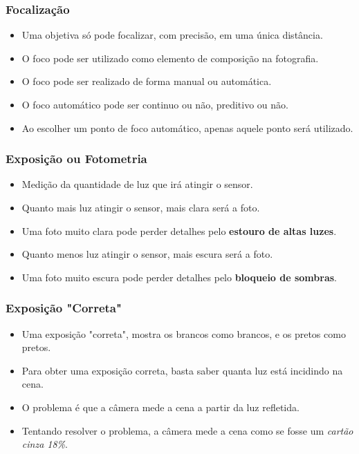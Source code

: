 \begin{frame}
    \frametitle{Focalização}
    \begin{itemize}
        \item Uma objetiva só pode focalizar, com precisão, em uma única distância.
        \item O foco pode ser utilizado como elemento de composição na fotografia.
        \item O foco pode ser realizado de forma manual ou automática.
        \item O foco automático pode ser continuo ou não, preditivo ou não.
        \item Ao escolher um ponto de foco automático, apenas aquele ponto será utilizado.
    \end{itemize}
\end{frame}

\begin{frame}
    \frametitle{Exposição ou Fotometria}
    \begin{itemize}
        \item Medição da quantidade de luz que irá atingir o sensor.
        \item Quanto mais luz atingir o sensor, mais clara será a foto.
        \item Uma foto muito clara pode perder detalhes pelo \textbf{estouro de altas luzes}.
        \item Quanto menos luz atingir o sensor, mais escura será a foto.
        \item Uma foto muito escura pode perder detalhes pelo \textbf{bloqueio de sombras}.
    \end{itemize}
\end{frame}

\begin{frame}
    \frametitle{Exposição "Correta"}

    \begin{itemize}
        \item Uma exposição "correta", mostra os brancos como brancos, e os pretos como pretos.
        \item Para obter uma exposição correta, basta saber quanta luz está incidindo na cena.
        \item O problema é que a câmera mede a cena a partir da luz refletida.
        \item Tentando resolver o problema, a câmera mede a cena como se fosse um \textit{cartão cinza 18\%}.
    \end{itemize}
\end{frame}

